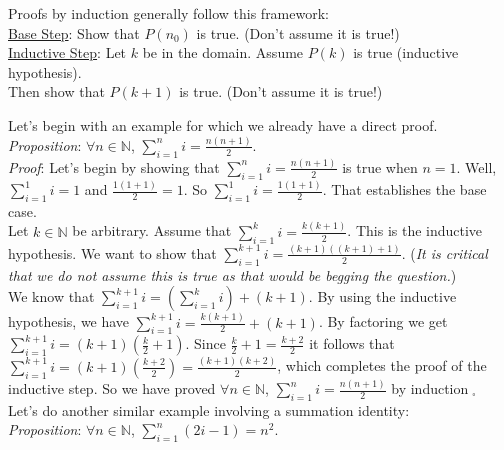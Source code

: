 \documentclass[12pt]{amsart}
\theoremstyle{definition}
\theoremstyle{remark}
\newcommand{\nats}{\mathbb N}
\begin{document}
Proofs by induction generally follow this framework:\\

\underline{Base Step}: Show that $P(n_0)$ is true. (Don't assume it is true!)\\

\underline{Inductive Step}:  Let $k$ be in the domain.  Assume $P(k)$ is true (inductive hypothesis).\\ Then show that $P(k+1)$ is true.  (Don't assume it is true!)


\newpage

Let's begin with an example for which we already have a direct proof.\\

\emph{Proposition}:  $\forall n\in\nats$, $\displaystyle \sum_{i=1}^n i=\frac{n(n+1)}{2}$.\\

\emph{Proof}:  Let's begin by showing that $\displaystyle \sum_{i=1}^n i=\frac{n(n+1)}{2}$ is true when $n=1$.  Well, $\displaystyle \sum_{i=1}^1 i=1$ and $\displaystyle \frac{1(1+1)}{2}=1$.  So  $\displaystyle \sum_{i=1}^1 i=\frac{1(1+1)}{2}$.  That establishes the base case. \\

Let $k\in \nats$ be arbitrary.  Assume that $\displaystyle \sum_{i=1}^k i=\frac{k(k+1)}{2}$.  This is the inductive hypothesis.  We want to show that $\displaystyle \sum_{i=1}^{k+1} i=\frac{(k+1)((k+1)+1)}{2}$. (\emph{It is critical that we do not assume this is true as that would be begging the question.})\\

We know that $\displaystyle \sum_{i=1}^{k+1} i=\left(\displaystyle \sum_{i=1}^{k} i\right)+(k+1)$.  By using the inductive hypothesis, we have $\displaystyle \sum_{i=1}^{k+1} i=\frac{k(k+1)}{2}+(k+1)$.  By factoring we get $\displaystyle \sum_{i=1}^{k+1} i=(k+1)\left(\frac{k}{2}+1\right)$.  Since $\displaystyle \frac{k}{2}+1=\frac{k+2}{2}$ it follows that $\displaystyle \sum_{i=1}^{k+1} i=(k+1)\left(\frac{k+2}{2}\right)=\frac{(k+1)(k+2)}{2}$, which completes the proof of the inductive step.  So we have proved $\forall n\in\nats$, $\displaystyle \sum_{i=1}^n i=\frac{n(n+1)}{2}$ by induction$\;_{\square}$\\

Let's do another similar example involving a summation identity:\\

\emph{Proposition}:  $\forall n\in\nats$, $\displaystyle \sum_{i=1}^n (2i-1)=n^2$.\\
\end{document}
